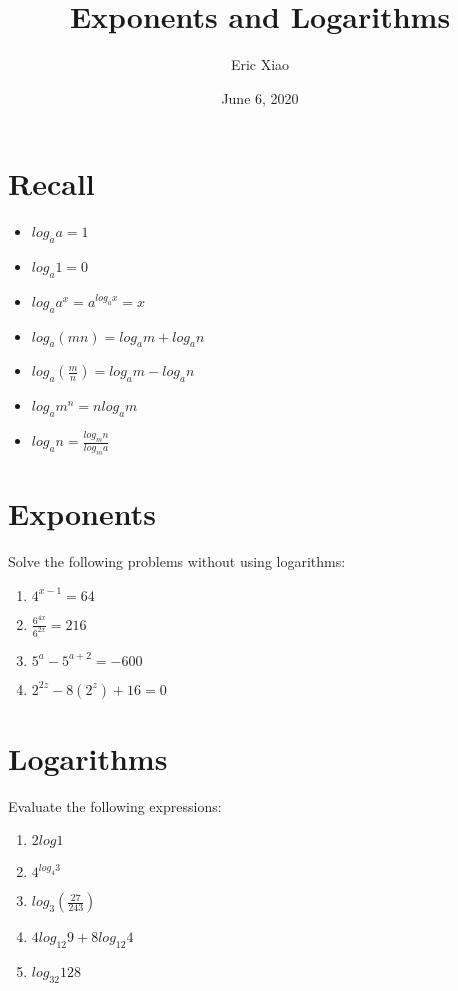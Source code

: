 \documentclass[12pt]{extarticle}
\title{Exponents and Logarithms}
\author{Eric Xiao}
\date{June 6, 2020}
\begin{document}
\maketitle

\section{Recall}
\begin{itemize}
    \item {$log_a a = 1$}
    \item {$log_a 1 = 0$}
    \item {$log_a a^x = a^{log_a x} = x$}
    \item {$log_a (mn) = log_a m + log_a n$}
    \item {$log_a (\frac{m}{n}) = log_a m - log_a n$}
    \item {$log_a m^n = nlog_a m$}
    \item {$log_a n = \frac{log_m n}{log_m a}$}
\end{itemize}

\section{Exponents}
{Solve the following problems without using logarithms:}
\begin{enumerate}
    \itemsep 1.5em
    \item {$4^{x-1} = 64$} %
    \item {$\frac{6^{4x}}{6^{2x}} = 216$} %
    \item {$5^a - 5^{a+2} = -600$} %
    \item {$2^{2z} - 8(2^z) + 16 = 0$} %
\end{enumerate}

\section{Logarithms}
{Evaluate the following expressions:}
\begin{enumerate}
    \itemsep 1.5em
    \item {$2log1$} %
    \item {$4^{log_4 3}$} %
    \item {$log_3 (\frac{27}{243})$} %
    \item {$4log_{12} 9 + 8log_{12} 4$} %
    \item {$log_{32} 128$} %
\end{enumerate}
\end{document}
